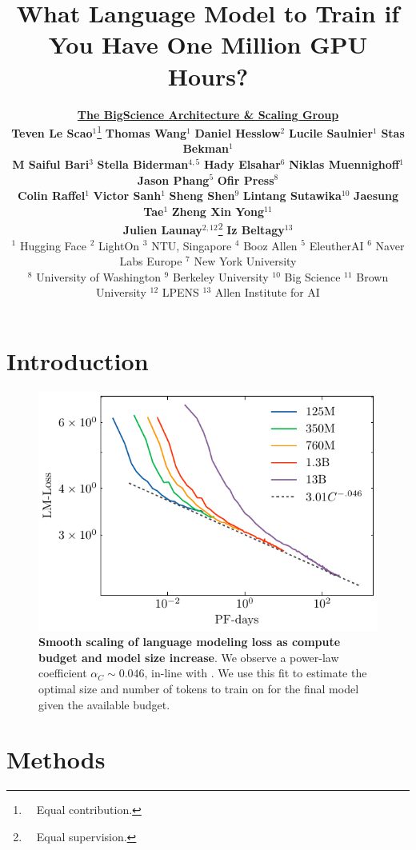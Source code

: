 \documentclass[11pt]{article}
\title{What Language Model to Train if You Have One Million GPU Hours?}
\author{\textbf{\underline{The BigScience Architecture \& Scaling Group}} \vspace{0.4cm}\\ \small
\textbf{Teven Le Scao}$^{1}$\thanks{~~Equal contribution.} \hspace{0.3cm}
\textbf{Thomas Wang}$^{1}$\samethanks \hspace{0.3cm}
\textbf{Daniel Hesslow}$^{2}$\samethanks \hspace{0.3cm}  \textbf{Lucile Saulnier}$^{1}$\samethanks \hspace{0.3cm}
\textbf{Stas Bekman}$^{1}$\samethanks \\
\small
\textbf{M Saiful Bari}$^3$ \hspace{0.3cm} \textbf{Stella Biderman}$^{4,5}$ \hspace{0.3cm} \textbf{Hady Elsahar}$^6$ \hspace{0.3cm} 
\textbf{Niklas Muennighoff}$^1$ \hspace{0.3cm} 
\textbf{Jason Phang}$^5$ \hspace{0.3cm} \textbf{Ofir Press}$^8$ \\
\small
\textbf{Colin Raffel}$^1$ \hspace{0.3cm}
\textbf{Victor Sanh}$^1$ \hspace{0.3cm}
 \textbf{Sheng Shen}$^9$ \hspace{0.3cm} \textbf{Lintang Sutawika}$^{10}$ \hspace{0.3cm} \textbf{Jaesung Tae}$^1$ \hspace{0.3cm} \textbf{Zheng Xin Yong}$^{11}$ \\
 \small
 \textbf{Julien Launay}$^{2, 12}$\thanks{~~Equal supervision.} \hspace{0.3cm}
 \textbf{Iz Beltagy}$^{13}$\samethanks\vspace{0.1cm} \\
 \small
 $^1$ Hugging Face \hspace{0.2cm} $^2$ LightOn \hspace{0.2cm} $^3$ NTU, Singapore \hspace{0.2cm} $^4$ Booz Allen \hspace{0.2cm} $^5$ EleutherAI \hspace{0.2cm} $^6$ Naver Labs Europe \hspace{0.2cm} $^7$ New York University\\
 \small$^8$ University of Washington \hspace{0.2cm} $^9$ Berkeley University \hspace{0.2cm} $^{10}$ Big Science \hspace{0.2cm} $^{11}$ Brown University \hspace{0.2cm} $^{12}$ LPENS \hspace{0.2cm} $^{13}$ Allen Institute for AI
}
\begin{document}
\onecolumn
\maketitle
\begin{abstract}

\end{abstract}
\section{Introduction}
\begin{figure}
    \centering
    \includegraphics[width=\columnwidth]{figures/OscarScaling.pdf}
    \caption{\textbf{Smooth scaling of language modeling loss as compute budget and model size increase}. We observe a power-law coefficient $\alpha_C \sim 0.046$, in-line with \citet{kaplan2020scaling}. We use this fit to estimate the optimal size and number of tokens to train on for the final model given the available budget.}
    \label{fig:scaling}
\end{figure}



\section{Methods}
\end{document}
